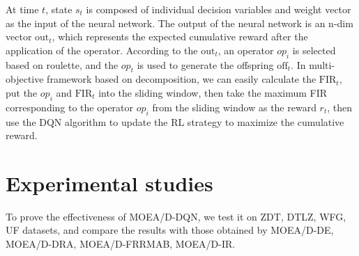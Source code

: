 \documentclass[journal]{IEEEtran}
\newcommand{\TODO}[1]{\textcolor[rgb]{1.00,0.40,0.22}{#1}}
\begin{document}
At time $t$, state $s_t$ is composed of individual decision variables and weight vector as the input of the neural network. The output of the neural network is an n-dim vector $\text{out}_t$, which represents the expected cumulative reward after the application of the operator.
According to the $\text{out}_t$, an operator $op_i$ is selected based on roulette, and the $op_t$ is used to generate the offspring $\text{off}_t$. In multi-objective framework based on decomposition, we can easily calculate the $\text{FIR}_t$, put the $op_i$ and $\text{FIR}_t$ into the sliding window, then take the maximum FIR corresponding to the operator $op_i$ from the sliding window as the reward $r_t$, then use the DQN algorithm to update the RL strategy to maximize the cumulative reward.



\section{Experimental studies}
To prove the effectiveness of MOEA/D-DQN, we test it on ZDT, DTLZ, WFG, UF datasets, and compare the results with those obtained by MOEA/D-DE, MOEA/D-DRA, MOEA/D-FRRMAB, MOEA/D-IR.
\end{document}
